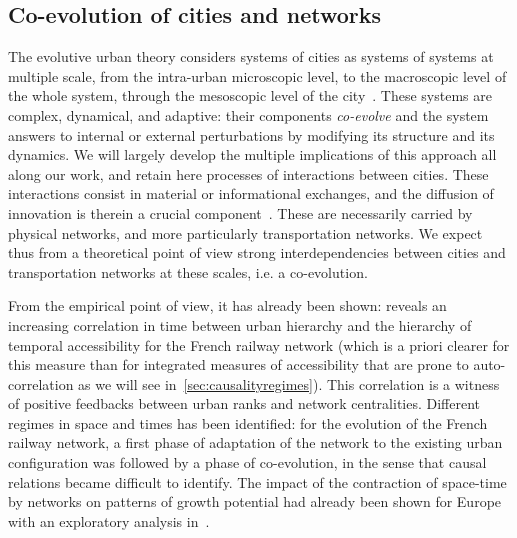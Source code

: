 \subsection{Co-evolution of cities and networks}

The evolutive urban theory considers systems of cities as systems of systems at multiple scale, from the intra-urban microscopic level, to the macroscopic level of the whole system, through the mesoscopic level of the city~\cite{pumain2008socio}. These systems are complex, dynamical, and adaptive: their components \emph{co-evolve} and the system answers to internal or external perturbations by modifying its structure and its dynamics. We will largely develop the multiple implications of this approach all along our work, and retain here processes of interactions between cities. These interactions consist in material or informational exchanges, and the diffusion of innovation is therein a crucial component~\cite{pumain2010theorie}. These are necessarily carried by physical networks, and more particularly transportation networks. We expect thus from a theoretical point of view strong interdependencies between cities and transportation networks at these scales, i.e. a co-evolution.

From the empirical point of view, it has already been shown: \cite{bretagnolle:tel-00459720} reveals an increasing correlation in time between urban hierarchy and the hierarchy of temporal accessibility for the French railway network (which is a priori clearer for this measure than for integrated measures of accessibility that are prone to auto-correlation as we will see in~\ref{sec:causalityregimes}). This correlation is a witness of positive feedbacks between urban ranks and network centralities. Different regimes in space and times has been identified: for the evolution of the French railway network, a first phase of adaptation of the network to the existing urban configuration was followed by a phase of co-evolution, in the sense that causal relations became difficult to identify. The impact of the contraction of space-time by networks on patterns of growth potential had already been shown for Europe with an exploratory analysis in~\cite{bretagnolle1998space}.

